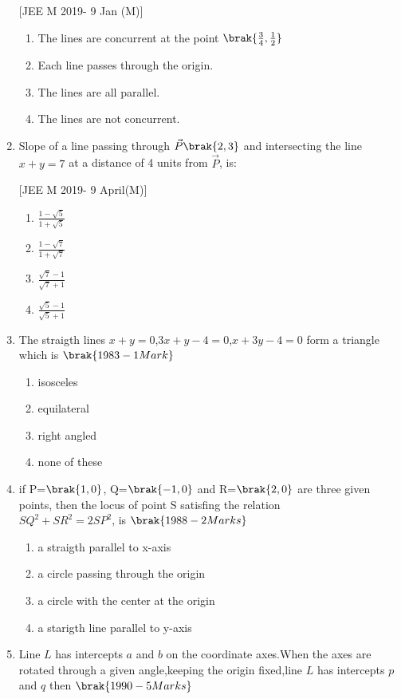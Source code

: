 \begin{enumerate}
\hfill{[JEE M 2019- 9 Jan (M)]}
\begin{enumerate}
\item The lines are concurrent at the point $\brak{\frac{3}{4}, \frac{1}{2}}$
\item Each line passes through the origin. 
\item The lines are all parallel.
\item The lines are not concurrent.
\end{enumerate}

\item Slope of a line passing through $\vec{P}\brak{2, 3}$ and intersecting the line $x+y=7$ at a distance of 4 units from $\vec{P}$, is:

\hfill{[JEE M 2019- 9 April(M)]}
\begin{multicols}{2}
\begin{enumerate}
\item $\frac{1-\sqrt{5}}{1+\sqrt{5}}$
\item $\frac{1-\sqrt{7}}{1+\sqrt{7}}$
\item $\frac{\sqrt{7}-1}{\sqrt{7}+1}$
\item $\frac{\sqrt{5}-1}{\sqrt{5}+1}$
\end{enumerate}
\end{multicols}
\item The straigth lines $x+y=0$,$3x+y-4=0$,$x+3y-4=0$ form a triangle which is \hfill{$\brak{1983-1 Mark}$}
\begin{enumerate}   
     \item isosceles
     \item equilateral
     \item right angled
     \item none of these
\end{enumerate}
\item if P=$\brak{1,0}$, Q=$\brak{-1,0}$ and R=$\brak{2,0}$ are three given points, then the locus of point S satisfing the relation\\$SQ^2+SR^2=2SP^2$, is 
\hfill{$\brak{1988-2 Marks}$}
\begin{enumerate}
    \item a straigth parallel to x-axis
    \item a circle passing through the origin
    \item a circle with the center at the origin 
    \item a starigth line parallel to y-axis 
\end{enumerate}
\item Line $L$ has intercepts $a$ and $b$ on the coordinate axes.When the axes are rotated through a given angle,keeping the origin fixed,line $L$ has intercepts $p$ and $q$ then
\hfill{$\brak{1990-5 Marks}$}
\begin{enumerate}
    

\end{enumerate}
\end{enumerate}
